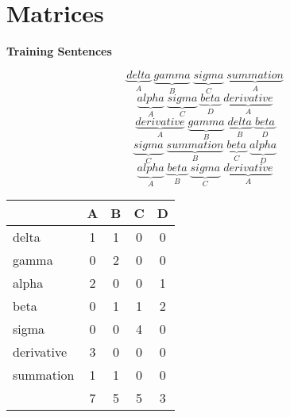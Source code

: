 \documentclass{article}
\begin{document}
\section{Matrices}
\begin{center}
	\textbf{Training Sentences}
\end{center}
\begin{equation}
	\underbrace{delta}_{A}\;\underbrace{gamma}_{B}\; \underbrace{sigma}_{C}\; \underbrace{summation}_{A}\;
\end{equation}
\begin{equation}
	\underbrace{alpha}_{A}\;\underbrace{sigma}_{C}\; \underbrace{beta}_{D}\; \underbrace{derivative}_{A}\;
\end{equation}
\begin{equation}
	\underbrace{derivative}_{A}\;\underbrace{gamma}_{B}\; \underbrace{delta}_{B}\; \underbrace{beta}_{D}\;
\end{equation}
\begin{equation}
	\underbrace{sigma}_{C}\;\underbrace{summation}_{B}\; \underbrace{beta}_{C}\; \underbrace{alpha}_{D}\;
\end{equation}
\begin{equation}
	\underbrace{alpha}_{A}\;\underbrace{beta}_{B}\; \underbrace{sigma}_{C}\; \underbrace{derivative}_{A}\;
\end{equation}
\begin{center}
\begin{tabular}{l|| c c c c}
\hline\hline
& 	A&	B&	C&	D	\\
\hline\hline
delta&		1&	1&	0&	0\\
gamma&		0&	2&	0&	0\\
alpha&		2& 	0&	0&	1\\
beta&		0&	1&	1&	2\\
sigma&		0&	0&	4&	0\\
derivative& 	3&	0&	0&	0\\
summation&	1&	1&	0&	0\\
		&7	&5	&5	&3\\
\hline
\end{tabular}
\end{center}
\end{document}
